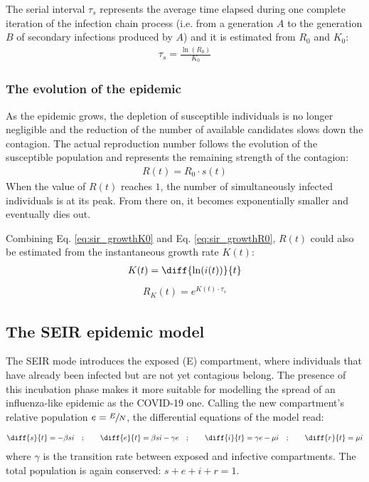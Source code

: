 \documentclass[DIV=12, BCOR=0pt]{scrartcl}  %
\begin{document}
The serial interval $\tau_s$ represents the average time elapsed during one complete iteration of the infection chain process (i.e. from a generation $A$ to the generation $B$ of secondary infections produced by $A$) and it is estimated from $R_0$ and $K_0$: 
	\begin{align}
		\tau_s = \frac{\ln(R_0)}{K_0}
		\label{eq:serial}
	\end{align}


  \subsubsection{The evolution of the epidemic}
  
  As the epidemic grows, the depletion of susceptible individuals is no longer negligible and the reduction of the number of available candidates slows down the contagion.
  The actual reproduction number follows the evolution of the susceptible population and represents the remaining strength of the contagion:
  \begin{align}
		R(t) = R_0 \cdot s(t) 
		\label{eq:Rt}
  \end{align}
  When the value of $R(t)$ reaches $1$, the number of simultaneously infected individuals is at its peak. From there on, it becomes exponentially smaller and eventually dies out.
  
  Combining Eq. \ref{eq:sir_growthK0} and Eq. \ref{eq:sir_growthR0}, $R(t)$ could also be estimated from the instantaneous growth rate $K(t)$:
  \begin{align}
  	K(t) =  \diff{\ln(i(t))}{t} %
  	\label{eq:Kt}
  \end{align}
  \begin{align}
  	R_K(t) = e^{K(t) \cdot \tau_s}
  	\label{eq:Rkt}
  \end{align}

  
  \subsection{The SEIR epidemic model}
  The SEIR mode introduces the exposed (E) compartment, where individuals that have already been infected but are not yet contagious belong. The presence of this incubation phase makes it more suitable for modelling the spread of an influenza-like epidemic as the COVID-19 one. Calling the new compartment's relative population $e = \sfrac{E}{N}$, the differential equations of the model read:
  
  \begin{align}
  	\diff{s}{t} = - \beta s i \quad;  \qquad 	\diff{e}{t} = \beta s i - \gamma e \quad; \qquad \diff{i}{t} = \gamma e - \mu i \quad; \qquad \diff{r}{t} = \mu i
  	\label{eq:seir}
  \end{align}
   where $\gamma$ is the transition rate between exposed and infective compartments. The total population is again conserved: $ s + e + i + r = 1$. 
  
\end{document}
